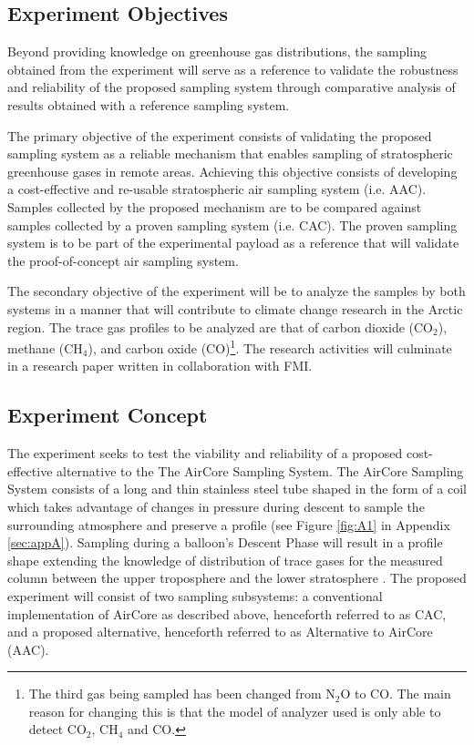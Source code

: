 \documentclass[a4paper,12pt,oneside]{article} %
\begin{document}
\subsection{Experiment Objectives}

Beyond providing knowledge on greenhouse gas distributions, the sampling obtained from the experiment will serve as a reference to validate the robustness and reliability of the proposed sampling system through comparative analysis of results obtained with a reference sampling system.

The primary objective of the experiment consists of validating the proposed sampling system as a reliable mechanism that enables sampling of stratospheric greenhouse gases in remote areas. Achieving this objective consists of developing a cost-effective and re-usable stratospheric air sampling system (i.e. AAC). Samples collected by the proposed mechanism are to be compared against samples collected by a proven sampling system (i.e. CAC). The proven sampling system is to be part of the experimental payload as a reference that will validate the proof-of-concept air sampling system.

The secondary objective of the experiment will be to analyze the samples by both systems in a manner that will contribute to climate change research in the Arctic region. The trace gas profiles to be analyzed are that of carbon dioxide (CO$_{2}$), methane (CH$_{4}$), and carbon oxide (CO)\footnote{The third gas being sampled has been changed from N$_{2}$O to CO. The main reason for changing this is that the model of analyzer used is only able to detect CO$_{2}$, CH$_{4}$ and CO.\label{fn:ChangeN2OtoCO}}. The research activities will culminate in a research paper written in collaboration with FMI.


\subsection{Experiment Concept}

The experiment seeks to test the viability and reliability of a proposed cost-effective alternative to the The AirCore Sampling System. The AirCore Sampling System consists of a long and thin stainless steel tube shaped in the form of a coil which takes advantage of changes in pressure during descent to sample the surrounding atmosphere and preserve a profile (see Figure \ref{fig:A1} in Appendix \ref{sec:appA}). Sampling during a balloon’s Descent Phase will result in a profile shape extending the knowledge of distribution of trace gases for the measured column between the upper troposphere and the lower stratosphere \cite{Karion}. The proposed experiment will consist of two sampling subsystems: a conventional implementation of AirCore as described above, henceforth referred to as CAC, and a proposed alternative, henceforth referred to as Alternative to AirCore (AAC).
\end{document}
